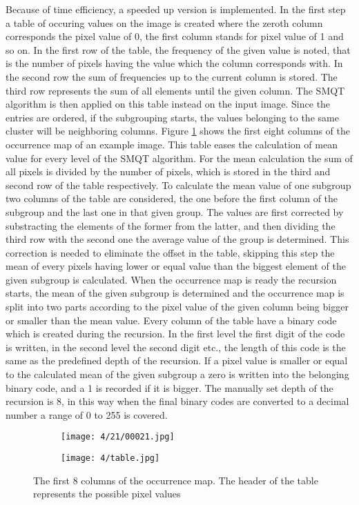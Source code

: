 \documentclass[draft,final]{vutinfth} %
\begin{document}
\par
Because of time efficiency, a speeded up version is implemented.
In the first step a table of occuring values on the image is created where the zeroth column corresponds the pixel value of 0, the first column stands for pixel value of 1 and so on.
In the first row of the table, the frequency of the given value is noted, that is the number of pixels having the value which the column corresponds with.
In the second row the sum of frequencies up to the current column is stored.
The third row represents the sum of all elements until the given column.
The SMQT algorithm is then applied on this table instead on the input image.
Since the entries are ordered, if the subgrouping starts, the values belonging to the same cluster will be neighboring columns.
Figure \ref{fig:fans:table} shows the first eight columns of the occurrence map of an example image.
This table eases the calculation of mean value for every level of the SMQT algorithm.
For the mean calculation the sum of all pixels is divided by the number of pixels, which is stored in the third and second row of the table respectively. 
To calculate the mean value of one subgroup two columns of the table are considered, the one before the first column of the subgroup and the last one in that given group.
The values are first corrected by substracting the elements of the former from the latter, and then dividing the third row with the second one the average value of the group is determined.
This correction is needed to eliminate the offset in the table, skipping this step the mean of every pixels having lower or equal value than the biggest element of the given subgroup is calculated.
When the occurrence map is ready the recursion starts, the mean of the given subgroup is determined and the occurrence map is split into two parts according to the pixel value of the given column being bigger or smaller than the mean value. 
Every column of the table have a binary code which is created during the recursion.
In the first level the first digit of the code is written, in the second level the second digit etc., the length of this code is the same as the predefined depth of the recursion.
If a pixel value is smaller or equal to the calculated mean of the given subgroup a zero is written into the belonging binary code, and a 1 is recorded if it is bigger.
The manually set depth of the recursion is 8, in this way when the final binary codes are converted to a decimal number a range of 0 to 255 is covered.
\begin{figure}[h]
  \centering
  \begin{subfigure}[t]{0.09\columnwidth}
    \centering
    \texttt{[image: 4/21/00021.jpg]}
  \end{subfigure}
  \begin{subfigure}[t]{0.9\columnwidth}
    \centering
    \texttt{[image: 4/table.jpg]}
  \end{subfigure}
  \caption{The first 8 columns of the occurrence map. The header of the table represents the possible pixel values }
  \label{fig:fans:table} %
\end{figure}
\end{document}
